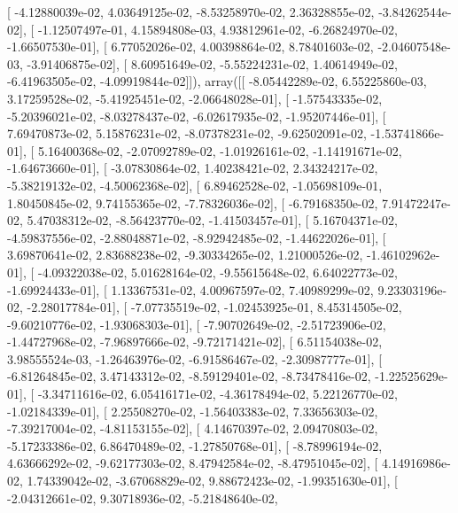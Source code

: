 \documentclass{article}
\begin{document}
       [ -4.12880039e-02,   4.03649125e-02,  -8.53258970e-02,
          2.36328855e-02,  -3.84262544e-02],
       [ -1.12507497e-01,   4.15894808e-03,   4.93812961e-02,
         -6.26824970e-02,  -1.66507530e-01],
       [  6.77052026e-02,   4.00398864e-02,   8.78401603e-02,
         -2.04607548e-03,  -3.91406875e-02],
       [  8.60951649e-02,  -5.55224231e-02,   1.40614949e-02,
         -6.41963505e-02,  -4.09919844e-02]]), array([[ -8.05442289e-02,   6.55225860e-03,   3.17259528e-02,
         -5.41925451e-02,  -2.06648028e-01],
       [ -1.57543335e-02,  -5.20396021e-02,  -8.03278437e-02,
         -6.02617935e-02,  -1.95207446e-01],
       [  7.69470873e-02,   5.15876231e-02,  -8.07378231e-02,
         -9.62502091e-02,  -1.53741866e-01],
       [  5.16400368e-02,  -2.07092789e-02,  -1.01926161e-02,
         -1.14191671e-02,  -1.64673660e-01],
       [ -3.07830864e-02,   1.40238421e-02,   2.34324217e-02,
         -5.38219132e-02,  -4.50062368e-02],
       [  6.89462528e-02,  -1.05698109e-01,   1.80450845e-02,
          9.74155365e-02,  -7.78326036e-02],
       [ -6.79168350e-02,   7.91472247e-02,   5.47038312e-02,
         -8.56423770e-02,  -1.41503457e-01],
       [  5.16704371e-02,  -4.59837556e-02,  -2.88048871e-02,
         -8.92942485e-02,  -1.44622026e-01],
       [  3.69870641e-02,   2.83688238e-02,  -9.30334265e-02,
          1.21000526e-02,  -1.46102962e-01],
       [ -4.09322038e-02,   5.01628164e-02,  -9.55615648e-02,
          6.64022773e-02,  -1.69924433e-01],
       [  1.13367531e-02,   4.00967597e-02,   7.40989299e-02,
          9.23303196e-02,  -2.28017784e-01],
       [ -7.07735519e-02,  -1.02453925e-01,   8.45314505e-02,
         -9.60210776e-02,  -1.93068303e-01],
       [ -7.90702649e-02,  -2.51723906e-02,  -1.44727968e-02,
         -7.96897666e-02,  -9.72171421e-02],
       [  6.51154038e-02,   3.98555524e-03,  -1.26463976e-02,
         -6.91586467e-02,  -2.30987777e-01],
       [ -6.81264845e-02,   3.47143312e-02,  -8.59129401e-02,
         -8.73478416e-02,  -1.22525629e-01],
       [ -3.34711616e-02,   6.05416171e-02,  -4.36178494e-02,
          5.22126770e-02,  -1.02184339e-01],
       [  2.25508270e-02,  -1.56403383e-02,   7.33656303e-02,
         -7.39217004e-02,  -4.81153155e-02],
       [  4.14670397e-02,   2.09470803e-02,  -5.17233386e-02,
          6.86470489e-02,  -1.27850768e-01],
       [ -8.78996194e-02,   4.63666292e-02,  -9.62177303e-02,
          8.47942584e-02,  -8.47951045e-02],
       [  4.14916986e-02,   1.74339042e-02,  -3.67068829e-02,
          9.88672423e-02,  -1.99351630e-01],
       [ -2.04312661e-02,   9.30718936e-02,  -5.21848640e-02,
\end{document}
